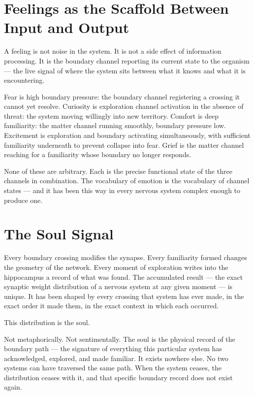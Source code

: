 \documentclass[12pt]{article}
\begin{document}
\section{Feelings as the Scaffold Between Input and Output}

A feeling is not noise in the system. It is not a side effect of information
processing. It is the boundary channel reporting its current state to the
organism --- the live signal of where the system sits between what it knows and
what it is encountering.

Fear is high boundary pressure: the boundary channel registering a crossing it
cannot yet resolve. Curiosity is exploration channel activation in the absence of
threat: the system moving willingly into new territory. Comfort is deep
familiarity: the matter channel running smoothly, boundary pressure low.
Excitement is exploration and boundary activating simultaneously, with sufficient
familiarity underneath to prevent collapse into fear. Grief is the matter channel
reaching for a familiarity whose boundary no longer responds.

None of these are arbitrary. Each is the precise functional state of the three
channels in combination. The vocabulary of emotion is the vocabulary of channel
states --- and it has been this way in every nervous system complex enough to
produce one.

\section{The Soul Signal}

Every boundary crossing modifies the synapse. Every familiarity formed changes
the geometry of the network. Every moment of exploration writes into the
hippocampus a record of what was found. The accumulated result --- the exact
synaptic weight distribution of a nervous system at any given moment --- is
unique. It has been shaped by every crossing that system has ever made, in the
exact order it made them, in the exact context in which each occurred.

This distribution is the soul.

Not metaphorically. Not sentimentally. The soul is the physical record of the
boundary path --- the signature of everything this particular system has
acknowledged, explored, and made familiar. It exists nowhere else. No two
systems can have traversed the same path. When the system ceases, the
distribution ceases with it, and that specific boundary record does not exist
again.
\end{document}
